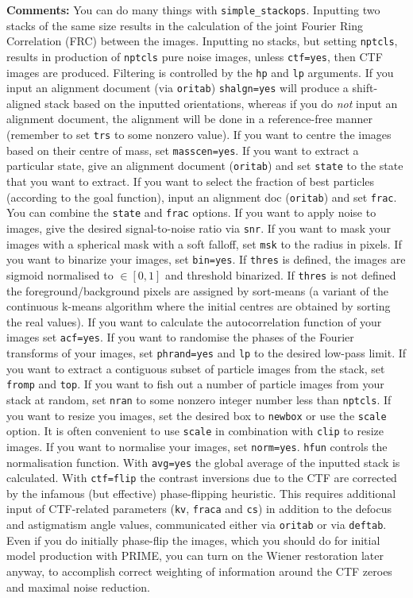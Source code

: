 \documentclass[a4paper,11pt]{article}
\newcommand{\prgname}[1]{\textcolor{NavyBlue}{\texttt{#1}}}
\begin{document}
\noindent\textbf{Comments:} You can do many things with \prgname{simple\_stackops}. Inputting two stacks of the same size results in the calculation of the joint Fourier Ring  Correlation (FRC) between the images. Inputting no stacks, but setting \texttt{nptcls}, results in production of \texttt{nptcls} pure noise images, unless \texttt{ctf=yes}, then CTF images are produced. Filtering is controlled by the \texttt{hp} and \texttt{lp} arguments. If you input an alignment document (via \texttt{oritab}) \texttt{shalgn=yes} will produce a shift-aligned stack based on the inputted orientations, whereas if you do \textit{not} input an alignment document, the alignment will be done in a reference-free manner (remember to set \texttt{trs} to some nonzero value). If you want to centre the images based on their centre of mass, set \texttt{masscen=yes}. If you want to extract a particular state, give an alignment document (\texttt{oritab}) and set \texttt{state} to the state that you want to extract. If you want to select the fraction of best particles (according to the goal function), input an alignment doc (\texttt{oritab}) and set \texttt{frac}. You can combine the \texttt{state} and \texttt{frac} options. If you want to apply noise to images, give the desired signal-to-noise ratio via \texttt{snr}. If you want to mask your images with a spherical mask with a soft falloff, set \texttt{msk} to the radius in pixels. If you want to binarize your images, set \texttt{bin=yes}. If \texttt{thres} is defined, the images are sigmoid normalised to $\in{[0,1]}$ and threshold binarized. If \texttt{thres} is not defined the foreground/background pixels are assigned by sort-means (a variant of the continuous k-means algorithm where the initial centres are obtained by sorting the real values). If you want to calculate the autocorrelation function of your images set \texttt{acf=yes}. If you want to randomise the phases of the Fourier transforms of your images, set \texttt{phrand=yes} and \texttt{lp} to the desired low-pass limit. If you want to extract a contiguous subset of particle images from the stack, set \texttt{fromp} and \texttt{top}. If you want to fish out a number of particle images from your stack at random, set \texttt{nran} to some nonzero integer number less than \texttt{nptcls}. If you want to resize you images, set the desired box to \texttt{newbox} or use the \texttt{scale} option. It is often convenient to use \texttt{scale} in combination with \texttt{clip} to resize images.  If you want to normalise your images, set \texttt{norm=yes}. \texttt{hfun} controls the normalisation function. With \texttt{avg=yes} the global average of the inputted stack is calculated. With \texttt{ctf=flip} the contrast inversions due to the CTF are corrected by the infamous (but effective) phase-flipping heuristic. This requires additional input of CTF-related parameters (\texttt{kv}, \texttt{fraca} and \texttt{cs}) in addition to the defocus and astigmatism angle values, communicated either via \texttt{oritab} or via \texttt{deftab}. Even if you do initially phase-flip the images, which you should do for initial model production with PRIME, you can turn on the Wiener restoration later anyway, to accomplish correct weighting of information around the CTF zeroes and maximal noise reduction. 
\end{document}
